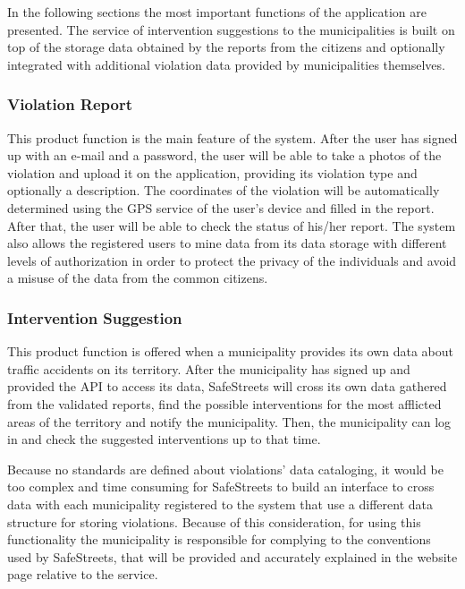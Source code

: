 In the following sections the most important functions of the application are presented. The service of intervention suggestions to the municipalities is built on top of the storage data obtained by the reports from the citizens and optionally integrated with additional violation data provided by municipalities themselves.
\subsubsection{Violation Report}
This product function is the main feature of the system. After the user has signed up with an e-mail and a password, the user will be able to take a photos of the violation and upload it on the application, providing its violation type and optionally a description. The coordinates of the violation will be automatically determined using the GPS service of the user's device and filled in the report. After that, the user will be able to check the status of his/her report. The system also allows the registered users to mine data from its data storage with different levels of authorization in order to protect the privacy of the individuals and avoid a misuse of the data from the common citizens.
\subsubsection{Intervention Suggestion}
This product function is offered when a municipality provides its own data about traffic accidents on its territory. After the municipality has signed up and provided the API to access its data, SafeStreets will cross its own data gathered from the validated reports, find the possible interventions for the most afflicted areas of the territory and notify the municipality. Then, the municipality can log in and check the suggested interventions up to that time.

Because no standards are defined about violations' data cataloging, it would be too complex and time consuming for SafeStreets to build an interface to cross data with each municipality registered to the system that use a different data structure for storing violations. Because of this consideration, for using this functionality the municipality is responsible for complying to the conventions used by SafeStreets, that will be provided and accurately explained in the website page relative to the service.